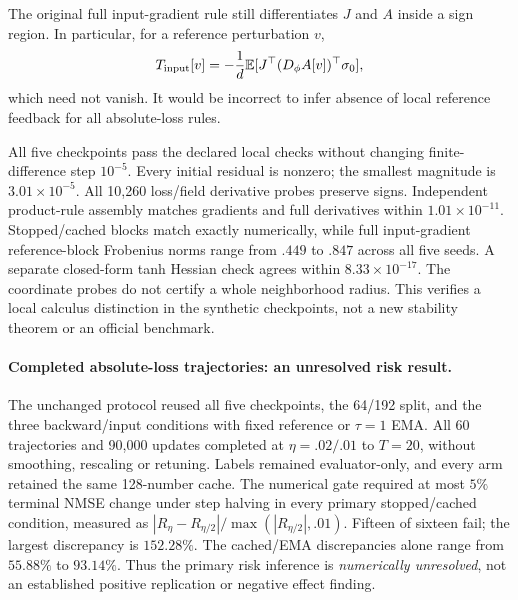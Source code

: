 \documentclass[11pt,a4paper]{article}
\newcommand{\E}{\mathbb{E}}
\begin{document}
The original full input-gradient rule still differentiates $J$ and $A$
inside a sign region. In particular, for a reference perturbation $v$,
\[
 T_{\rm input}[v]=-\frac1d\E[J^\top(D_\phi A[v])^\top\sigma_0],
\]
which need not vanish. It would be incorrect to infer absence of local
reference feedback for all absolute-loss rules.

All five checkpoints pass the declared local checks without changing
finite-difference step $10^{-5}$. Every initial residual is nonzero;
the smallest magnitude is $3.01\times10^{-5}$. All 10,260 loss/field
derivative probes preserve signs. Independent product-rule assembly
matches gradients and full derivatives within $1.01\times10^{-11}$.
Stopped/cached blocks match exactly numerically, while full input-gradient
reference-block Frobenius norms range from $.449$ to $.847$ across all
five seeds. A separate closed-form tanh Hessian check agrees within
$8.33\times10^{-17}$. The coordinate probes do not certify a whole
neighborhood radius. This verifies a local calculus distinction in the
synthetic checkpoints, not a new stability theorem or an official benchmark.

\paragraph{Completed absolute-loss trajectories: an unresolved risk result.}
The unchanged protocol reused all five checkpoints, the 64/192 split,
and the three backward/input conditions with fixed reference or
$\tau=1$ EMA. All 60 trajectories and 90,000 updates completed at
$\eta=.02/.01$ to $T=20$, without smoothing, rescaling or retuning.
Labels remained evaluator-only, and every arm retained the same
128-number cache. The numerical gate required at most $5\%$ terminal
NMSE change under step halving in every primary stopped/cached condition,
measured as $|R_{\eta}-R_{\eta/2}|/\max(|R_{\eta/2}|,.01)$.
Fifteen of sixteen fail; the largest discrepancy is $152.28\%$.
The cached/EMA discrepancies alone range from $55.88\%$ to $93.14\%$.
Thus the primary risk inference is \emph{numerically unresolved},
not an established positive replication or negative effect finding.
\end{document}
